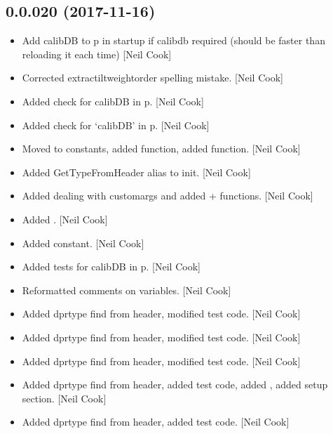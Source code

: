 \documentclass[a4paper,10pt,english]{report}
\begin{document}
\subsection{0.0.020 (2017-11-16)}
\label{\detokenize{misc/changelog:id531}}\begin{itemize}
\item {} 
Add calibDB to p in startup if calibdb required (should be faster than
reloading it each time) {[}Neil Cook{]}

\item {} 
Corrected  extractiltweightorder spelling mistake. {[}Neil Cook{]}

\item {} 
Added check for calibDB in p. {[}Neil Cook{]}

\item {} 
Added check for ‘calibDB’ in p. {[}Neil Cook{]}

\item {} 
Moved  to constants, added 
function, added  function. {[}Neil Cook{]}

\item {} 
Added GetTypeFromHeader alias to init. {[}Neil Cook{]}

\item {} 
Added dealing with customargs and added  +
 functions. {[}Neil Cook{]}

\item {} 
Added . {[}Neil Cook{]}

\item {} 
Added  constant. {[}Neil Cook{]}

\item {} 
Added tests for calibDB in p. {[}Neil Cook{]}

\item {} 
Reformatted comments on variables. {[}Neil Cook{]}

\item {} 
Added dprtype find from header, modified test code. {[}Neil Cook{]}

\item {} 
Added dprtype find from header, modified test code. {[}Neil Cook{]}

\item {} 
Added dprtype find from header, modified test code. {[}Neil Cook{]}

\item {} 
Added dprtype find from header, added test code, added , added
setup section. {[}Neil Cook{]}

\item {} 
Added dprtype find from header, added test code. {[}Neil Cook{]}

\end{itemize}
\end{document}
